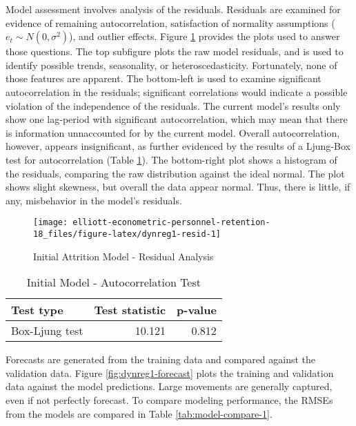 \documentclass[12pt,letterpaper,toc=flat,oneside]{report}
\theoremstyle{definition}
\theoremstyle{definition}
\theoremstyle{definition}
\theoremstyle{remark}
\begin{document}
Model assessment involves analysis of the residuals. Residuals are
examined for evidence of remaining autocorrelation, satisfaction of
normality assumptions (\(e_t \sim N(0,\sigma^2)\)), and outlier effects.
Figure \ref{fig:dynreg1-resid} provides the plots used to answer those
questions. The top subfigure plots the raw model residuals, and is used
to identify possible trends, seasonality, or heteroscedasticity.
Fortunately, none of those features are apparent. The bottom-left is
used to examine significant autocorrelation in the residuals;
significant correlations would indicate a possible violation of the
independence of the residuals. The current model's results only show one
lag-period with significant autocorrelation, which may mean that there
is information unnaccounted for by the current model. Overall
autocorrelation, however, appears insignificant, as further evidenced by
the results of a Ljung-Box test for autocorrelation (Table
\ref{tab:dynreg1-boxtest}). The bottom-right plot shows a histogram of
the residuals, comparing the raw distribution against the ideal normal.
The plot shows slight skewness, but overall the data appear normal.
Thus, there is little, if any, misbehavior in the model's residuals.

\begin{figure}[H]

{\centering \texttt{[image: elliott-econometric-personnel-retention-18\_files/figure-latex/dynreg1-resid-1]} 

}

\caption{Initial Attrition Model - Residual Analysis}\label{fig:dynreg1-resid}
\end{figure}

\begin{table}[!h]

\caption{\label{tab:dynreg1-boxtest}Initial Model - Autocorrelation Test}
\centering
\begin{tabular}[t]{lrr}
\toprule
\bfseries{Test type} & \bfseries{Test statistic} & \bfseries{p-value}\\
\midrule
Box-Ljung test & 10.121 & 0.812\\
\bottomrule
\end{tabular}
\end{table}

Forecasts are generated from the training data and compared against the
validation data. Figure \ref{fig:dynreg1-forecast} plots the training
and validation data against the model predictions. Large movements are
generally captured, even if not perfectly forecast. To compare modeling
performance, the RMSEs from the models are compared in Table
\ref{tab:model-compare-1}.
\end{document}
